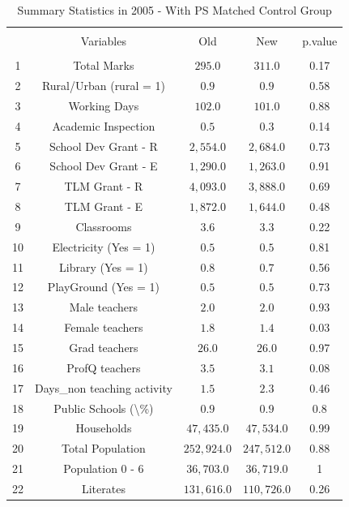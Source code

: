 \documentclass[12pt, a4paper]{article}
\begin{document}
	\begin{table}[!htbp] \centering 
		\caption{Summary Statistics in 2005 - With PS Matched Control Group} 
		\label{} 
		\begin{tabular}{@{\extracolsep{5pt}} ccccc} 
			\\[-1.8ex]\hline 
			\hline \\[-1.8ex] 
			& Variables & Old & New & p.value \\ 
			\hline \\[-1.8ex] 
			1 & Total Marks & $295.0$ & $311.0$ & 0.17 \\ 
			2 & Rural/Urban (rural = 1) & $0.9$ & $0.9$ & 0.58 \\ 
			3 & Working Days & $102.0$ & $101.0$ & 0.88 \\ 
			4 & Academic Inspection & $0.5$ & $0.3$ & 0.14 \\ 
			5 & School Dev Grant - R & $2,554.0$ & $2,684.0$ & 0.73 \\ 
			6 & School Dev Grant - E & $1,290.0$ & $1,263.0$ & 0.91 \\ 
			7 & TLM Grant - R & $4,093.0$ & $3,888.0$ & 0.69 \\ 
			8 & TLM Grant - E & $1,872.0$ & $1,644.0$ & 0.48 \\ 
			9 & Classrooms & $3.6$ & $3.3$ & 0.22 \\ 
			10 & Electricity (Yes = 1) & $0.5$ & $0.5$ & 0.81 \\ 
			11 & Library  (Yes = 1) & $0.8$ & $0.7$ & 0.56 \\ 
			12 & PlayGround  (Yes = 1) & $0.5$ & $0.5$ & 0.73 \\ 
			13 & Male teachers & $2.0$ & $2.0$ & 0.93 \\ 
			14 & Female teachers & $1.8$ & $1.4$ & 0.03 \\ 
			15 & Grad teachers & $26.0$ & $26.0$ & 0.97 \\ 
			16 & ProfQ teachers & $3.5$ & $3.1$ & 0.08 \\ 
			17 & Days\_non teaching activity & $1.5$ & $2.3$ & 0.46 \\ 
			18 & Public Schools (\textbackslash \%) & $0.9$ & $0.9$ & 0.8 \\ 
			19 & Households & $47,435.0$ & $47,534.0$ & 0.99 \\ 
			20 & Total Population & $252,924.0$ & $247,512.0$ & 0.88 \\ 
			21 & Population 0 - 6 & $36,703.0$ & $36,719.0$ & 1 \\ 
			22 & Literates & $131,616.0$ & $110,726.0$ & 0.26 \\ 

\end{tabular}
\end{table}
\end{document}
